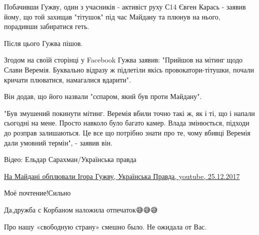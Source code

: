\begin{itemize}
\begin{itemize}
{Побачивши Гужву, один з учасників - активіст руху С14 Євген Карась - заявив
йому, що той захищав "тітушок" під час Майдану та плюнув на нього, порадивши
забиратися геть. 

Після цього Гужва пішов. 

Згодом на своїй сторінці у Facebook Гужва заявив: "Прийшов на мітинг щодо Слави
Веремія. Буквально відразу ж підлетіли якісь провокатори-тітушки, почали
кричати плюватися, намагалися вдарити".

Він додав, що його назвали "сєпаром, який був проти Майдану".

"Був змушений покинути мітинг. Веремія вбили точно такі ж, як і ті, що і напали
сьогодні на мене. Просто навколо було багато камер. Влада змінюється, підходи
до розправ залишаються. Це все що потрібно знати про те, чому вбивці Веремія
дали умовний термін", - заявив він. 

Відео: Ельдар Сарахман/Українська правда
}
\href{https://youtu.be/YJztyd74998}{На Майдані обплювали Ігора Гужву, Українська Правда, youtube, 25.12.2017}

\end{itemize}

 
Моё почтение!Сильно👏

 
Да,дружба с Корбаном наложила отпечаток😅😅😅

 
Про нашу «свободную страну» смешно было. Не ожидала от Вас.

\begin{itemize}
 

\end{itemize}
\end{itemize}
